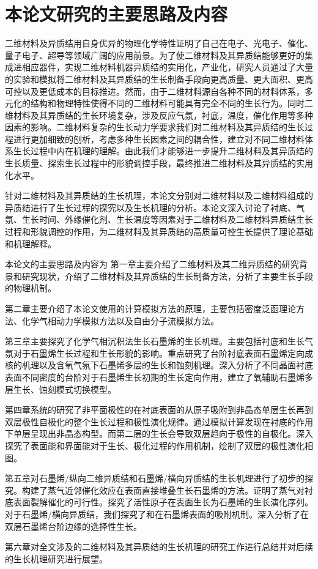 \section{本论文研究的主要思路及内容}
    二维材料及异质结用自身优异的物理化学特性证明了自己在电子、光电子、催化、量子电子、超导等领域广阔的应用前景。为了使二维材料及其异质结能够更好的集成进相应器件，实现二维材料机器异质结的实用化，产业化，研究人员通过了大量的实验和模拟将二维材料及其异质结的生长制备手段向更高质量、更大面积、更高可控以及更低成本的目标推进。然而，由于二维材料源自各种不同的材料体系，多元化的结构和物理特性使得不同的二维材料可能具有完全不同的生长行为。同时二维材料及其异质结的生长环境复杂，涉及反应气氛，衬底，温度，催化作用等多种因素的影响。二维材料复杂的生长动力学要求我们对二维材料及其异质结的生长过程进行更加细致的刨析，考虑多种生长因素之间的耦合性，建立对不同二维材料体系生长过程中内在机理的理解。由此我们才能够进一步提升二维材料及其异质结的生长质量、探索生长过程中的形貌调控手段，最终推进二维材料及其异质结的实用化水平。

    针对二维材料及其异质结的生长机理，本论文分别对二维材料以及二维材料组成的异质结进行了生长过程的探究以及生长机理的分析。本论文深入讨论了衬底、气氛、生长时间、外缘催化剂、生长温度等因素对于二维材料及二维材料异质结生长过程和形貌调控的作用，为二维材料及其异质结的高质量可控生长提供了理论基础和机理解释。

    本论文的主要思路及内容为\chinesecolon
    第一章主要介绍了二维材料及其二维异质结的研究背景和研究现状，介绍了二维材料及其异质结的生长制备方法，分析了主要生长手段的物理机制。

    第二章主要介绍了本论文使用的计算模拟方法的原理，主要包括密度泛函理论方法、化学气相动力学模拟方法以及自由分子流模拟方法。

    第三章主要探究了化学气相沉积法生长石墨烯的生长机理。主要包括衬底和生长气氛对于石墨烯生长过程和生长形貌的影响。重点研究了台阶衬底表面石墨烯定向成核的机理以及含氧气氛下石墨烯多层的生长和蚀刻机理。深入分析了不同晶面衬底表面不同密度的台阶对于石墨烯生长初期的生长定向作用，建立了氧辅助石墨烯多层生长、蚀刻模式切换模型。

    第四章系统的研究了非平面极性的在衬底表面的从原子吸附到非晶态单层生长再到双层极性自极化的整个生长过程和极性演化规律。通过模拟计算发现在衬底的作用下单层呈现出非晶态构型。而第二层的生长会导致双层趋向于极性的自极化。深入探究了表面能和界面能对于生长、极化过程的作用机制，绘制了双层的极性演化相图。

    第五章对石墨烯/纵向二维异质结和石墨烯/横向异质结的生长机理进行了初步的探究。构建了蒸气近邻催化效应在表面直接堆叠生长石墨烯的方法。证明了蒸气对衬底表面裂解催化的可行性。探究了活性原子在表面生长为石墨烯的生长演化序列。对于石墨烯/横向异质结，我们探究了和在石墨烯表面的吸附机制。深入分析了在双层石墨烯台阶边缘的选择性生长。

    第六章对全文涉及的二维材料及其异质结的生长机理的研究工作进行总结并对后续的生长机理研究进行展望。
